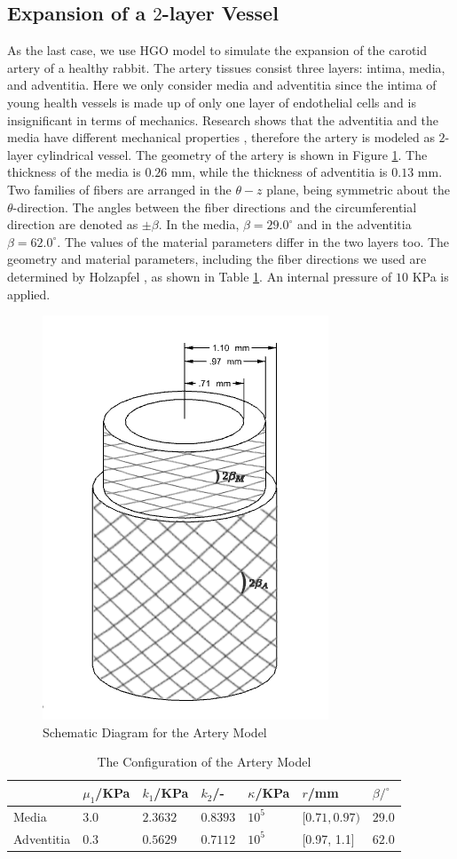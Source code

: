 \subsection{Expansion of a $2$-layer Vessel}
As the last case, we use HGO model to simulate the expansion of the carotid artery of a healthy rabbit. The artery tissues consist three layers: intima, media, and adventitia. Here we only consider media and adventitia since the intima of young health vessels is made up of only one layer of endothelial cells and is insignificant in terms of mechanics. Research shows that the adventitia and the media have different mechanical properties \cite{Keitzer, Fung3}, therefore the artery is modeled as $2$-layer cylindrical vessel. The geometry of the artery is shown in Figure \ref{fig:vessel_schematic3}. The thickness of the media is $0.26$ mm, while the thickness of adventitia is $0.13$ mm. Two families of fibers are arranged in the $\theta-z$ plane, being symmetric about the $\theta$-direction. The angles between the fiber directions and the circumferential direction are denoted as $\pm\beta$. In the media, $\beta = 29.0^\circ$ and in the adventitia $\beta = 62.0^\circ$. The values of the material parameters differ in the two layers too. The geometry and material parameters, including the fiber directions we used are determined by Holzapfel \cite{Holzapfel2}, as shown in Table \ref{table:artery}. An internal pressure of $10$ KPa is applied. 

\begin{figure}[H]
\centering
\includegraphics[width=.3\textwidth]{./figures/vessel_schematic2.png}
\caption{Schematic Diagram for the Artery Model}
\label{fig:vessel_schematic3}
\end{figure}

\begin{table}[H]
\centering
\caption{The Configuration of the Artery Model}
\label{table:artery}
\begin{tabular}{ l l l l l l l}
\hline
& $\mu_1$/KPa & $k_1$/KPa & $k_2$/- & $\kappa$/KPa & $r$/mm & $\beta/^\circ$ \\
 \hline
 Media &   $3.0$ & $2.3632$ & $0.8393$ & $10^5$ & $[0.71, 0.97)$ & $29.0$\\
 Adventitia & $0.3$ & $0.5629$ & $0.7112$ & $10^5$ & [0.97, 1.1] & $62.0$\\
 \hline
\end{tabular}
\end{table}

